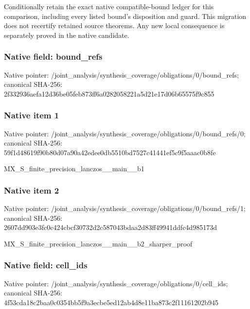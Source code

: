 \documentclass[10pt,a4paper]{article}
\begin{document}
\begingroup\raggedright\sloppy Conditionally retain the exact native compatible-bound ledger for this comparison,\allowbreak{} including every listed bound's disposition and guard. This migration does not recertify retained source theorems. Any new local consequence is separately proved in the native candidate.\par\endgroup

\subsubsection{Native field: bound\_\allowbreak{}refs}
Native pointer: /joint\_\allowbreak{}analysis/synthesis\_\allowbreak{}coverage/obligations/0/bound\_\allowbreak{}refs; canonical SHA-256: 2f332936aefa12d36be05feb873ff6a0282058221a5d21e17d06b65575f9c855

\subsubsection{Native item 1}
Native pointer: /joint\_\allowbreak{}analysis/synthesis\_\allowbreak{}coverage/obligations/0/bound\_\allowbreak{}refs/0; canonical SHA-256: 59f1d48619f90b80d07a90a42edee0db5510bd7527c41441ef5c9f5aaac0b8fe

\begingroup\raggedright\sloppy MX\_\allowbreak{}S\_\allowbreak{}finite\_\allowbreak{}precision\_\allowbreak{}lanczos\_\allowbreak{}\_\allowbreak{}main\_\allowbreak{}\_\allowbreak{}b1\par\endgroup

\subsubsection{Native item 2}
Native pointer: /joint\_\allowbreak{}analysis/synthesis\_\allowbreak{}coverage/obligations/0/bound\_\allowbreak{}refs/1; canonical SHA-256: 2607dd903e3fc0c424cbcf30732d2c587043bdaa2d83ff49941ddfc4d985173d

\begingroup\raggedright\sloppy MX\_\allowbreak{}S\_\allowbreak{}finite\_\allowbreak{}precision\_\allowbreak{}lanczos\_\allowbreak{}\_\allowbreak{}main\_\allowbreak{}\_\allowbreak{}b2\_\allowbreak{}sharper\_\allowbreak{}proof\par\endgroup

\subsubsection{Native field: cell\_\allowbreak{}ids}
Native pointer: /joint\_\allowbreak{}analysis/synthesis\_\allowbreak{}coverage/obligations/0/cell\_\allowbreak{}ids; canonical SHA-256: 4f53cda18c2baa0c0354bb5f9a3ecbe5ed12ab4d8e11ba873c2f11161202b945
\end{document}
